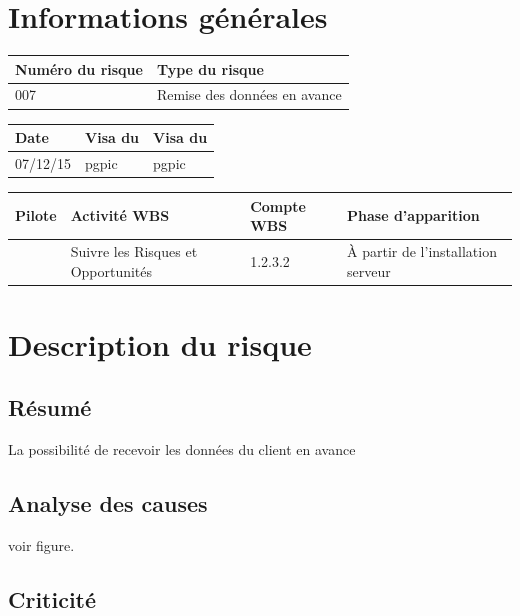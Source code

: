 \section*{Informations générales}
 
\begin{table}[H]
\centering
	\begin{tabularx}{16.8cm}{|X|X|}
	\hline
	\rowcolor{gray!40} Numéro du risque & Type du risque \\
	\hline
	007 &  Remise des données en avance \\
	\hline
	\end{tabularx}
\end{table}

\begin{table}[H]
\centering
	\begin{tabularx}{12.8cm}{|X|X|X|}
	\hline
	\rowcolor{gray!40} Date & Visa du \RQ & Visa du \CP \\
	\hline
	 07/12/15 & pgpic & pgpic \\
	\hline
	\end{tabularx}
\end{table}

\begin{table}[H]
\centering
	\begin{tabularx}{12.8cm}{|X|X|X|X|}
	\hline
	\rowcolor{gray!40} Pilote & Activité WBS & Compte WBS & Phase d'apparition \\
	\hline
	 \Sergi & Suivre les Risques et Opportunités & 1.2.3.2 & À partir de l’installation serveur\\
	\hline
	\end{tabularx}
\end{table}

\section*{Description du risque}

\subsection*{Résumé}
	La possibilité de recevoir les données du client en avance 
	
\subsection*{Analyse des causes}
	voir figure.

\subsection*{Criticité}

